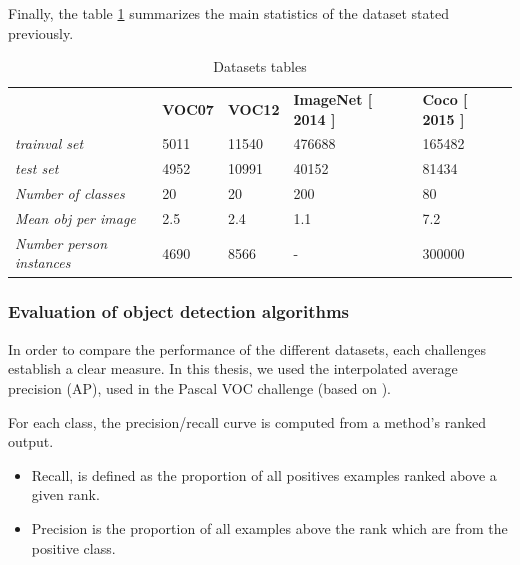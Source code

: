 \documentclass[12pt, a4paper, titlepage,twoside,openright]{article}
\begin{document}
Finally, the table \ref{dataset0} summarizes the main statistics of the dataset stated previously.

\begin{table}[H]
\centering

\begin{tabular}{lllll}
                                 & \textbf{VOC07} & \textbf{VOC12} & \textbf{ImageNet [ 2014 ]} & \textbf{Coco [ 2015 ]} \\
\textit{trainval set}            & 5011           & 11540          & 476688                     & 165482                 \\
\textit{test set}                & 4952           & 10991          & 40152                      & 81434                  \\
\textit{Number of classes}       & 20             & 20             & 200                        & 80                     \\
\textit{Mean obj per image}      & 2.5            & 2.4            & 1.1                        & 7.2                    \\
\textit{Number person instances} & 4690           & 8566           & -                          & 300000                
\end{tabular}
\caption{Datasets tables}
\label{dataset0}
\end{table}


\subsubsection{Evaluation of object detection algorithms}

In order to compare the performance of the different datasets, each challenges establish a clear measure. In this thesis, we used the interpolated average precision (AP), used in the Pascal VOC challenge (based on \cite{salton}).

For each class, the precision/recall curve is computed from a method's ranked output.

\begin{itemize}

\item Recall, is defined as the proportion of all positives examples ranked above a given rank.

\item Precision is the proportion of all examples above the rank which are from the positive class.

\end{itemize}
\end{document}
